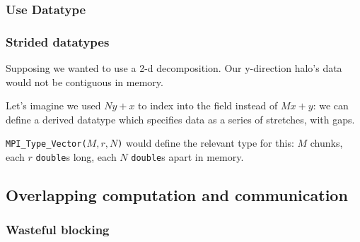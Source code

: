 \subsubsection{Use Datatype}\label{use-datatype}

\begin{Shaded}
\begin{Highlighting}[]

 
\NormalTok{\}}
\end{Highlighting}
\end{Shaded}

\subsubsection{Strided datatypes}\label{strided-datatypes}

Supposing we wanted to use a 2-d decomposition. Our y-direction halo's
data would not be contiguous in memory.

Let's imagine we used $Ny+x$ to index into the field instead of $Mx+y$:
we can define a derived datatype which specifies data as a series of
stretches, with gaps.

\texttt{MPI\_Type\_Vector(}$M,r,N$\texttt{)} would define the relevant
type for this: $M$ chunks, each $r$ \texttt{double}s long, each $N$
\texttt{double}s apart in memory.

\subsection{Overlapping computation and
communication}\label{overlapping-computation-and-communication}

\subsubsection{Wasteful blocking}\label{wasteful-blocking}

